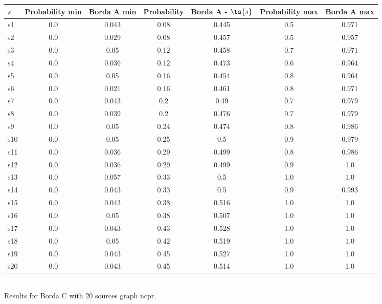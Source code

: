 \documentclass{article}
\begin{document}
\noindent\begin{tabular}{|l|c|c|c|c|c|c|}
\hline
$s$& Probability min & Borda A min & Probability & Borda A - $\ts{s}$ & Probability max & Borda A max\\
\hline
s1 &0.0 & 0.043 & 0.08 & 0.445 & 0.5 & 0.971\\
\hline
s2 &0.0 & 0.029 & 0.08 & 0.457 & 0.5 & 0.957\\
\hline
s3 &0.0 & 0.05 & 0.12 & 0.458 & 0.7 & 0.971\\
\hline
s4 &0.0 & 0.036 & 0.12 & 0.473 & 0.6 & 0.964\\
\hline
s5 &0.0 & 0.05 & 0.16 & 0.454 & 0.8 & 0.964\\
\hline
s6 &0.0 & 0.021 & 0.16 & 0.461 & 0.8 & 0.971\\
\hline
s7 &0.0 & 0.043 & 0.2 & 0.49 & 0.7 & 0.979\\
\hline
s8 &0.0 & 0.039 & 0.2 & 0.476 & 0.7 & 0.979\\
\hline
s9 &0.0 & 0.05 & 0.24 & 0.474 & 0.8 & 0.986\\
\hline
s10 &0.0 & 0.05 & 0.25 & 0.5 & 0.9 & 0.979\\
\hline
s11 &0.0 & 0.036 & 0.29 & 0.499 & 0.8 & 0.986\\
\hline
s12 &0.0 & 0.036 & 0.29 & 0.499 & 0.9 & 1.0\\
\hline
s13 &0.0 & 0.057 & 0.33 & 0.5 & 1.0 & 1.0\\
\hline
s14 &0.0 & 0.043 & 0.33 & 0.5 & 0.9 & 0.993\\
\hline
s15 &0.0 & 0.043 & 0.38 & 0.516 & 1.0 & 1.0\\
\hline
s16 &0.0 & 0.05 & 0.38 & 0.507 & 1.0 & 1.0\\
\hline
s17 &0.0 & 0.043 & 0.43 & 0.528 & 1.0 & 1.0\\
\hline
s18 &0.0 & 0.05 & 0.42 & 0.519 & 1.0 & 1.0\\
\hline
s19 &0.0 & 0.043 & 0.45 & 0.527 & 1.0 & 1.0\\
\hline
s20 &0.0 & 0.043 & 0.45 & 0.514 & 1.0 & 1.0\\
\hline
\end{tabular}\\

\noindent Results for Borda C with 20 sources graph ncpr.
\end{document}
